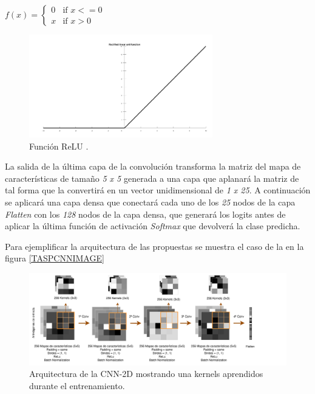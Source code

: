             \begin{center}
                $f(x) = \left\{
                               \begin{array}{lr}
                                 0 & \text{if } x<=0\\
                                 x & \text{if } x>0
                               \end{array}
                        \right.$
            \end{center}

            \begin{figure}[h]
                \centering
                \includegraphics[width=8cm]{archivos/4.Metodologia/Modelos/CNN/RELUImage}
                \caption{Función ReLU \cite{CNNReLUImage}.}
                \label{RELUImage}
             \end{figure}

            La salida de la última capa de la convolución transforma la matriz del mapa de características de tamaño \textit{5 x 5} generada a una capa que aplanará la matriz de tal forma que la convertirá en un vector unidimensional de \textit{1 x 25}. A continuación se aplicará una capa densa que conectará cada uno de los \textit{25} nodos de la capa \textit{Flatten} con los \textit{128} nodos de la capa densa, que generará los logits antes de aplicar la última función de activación \textit{Softmax} que devolverá la clase predicha.


            Para ejemplificar la arquitectura de las  propuestas se muestra el caso de la  en la figura \eqref{TASPCNNIMAGE}


            \begin{figure}[H]
                \centering
                \includegraphics[width=17cm]{archivos/4.Metodologia/Modelos/CNN/2D/TASPCNN}
                \caption{Arquitectura de la CNN-2D mostrando una  kernels aprendidos durante el entrenamiento.}
                \label{TASPCNNIMAGE}
             \end{figure}


